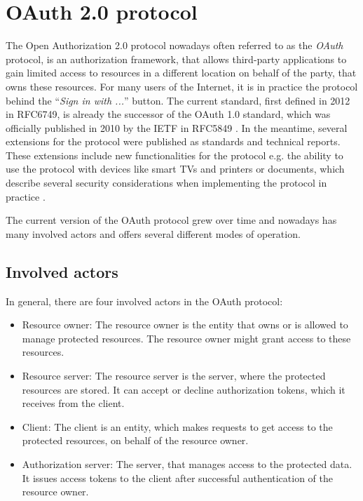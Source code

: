 \documentclass[
    fontsize=12pt,
    headings=small,
    parskip=half,           %
    bibliography=totoc,
    numbers=noenddot,       %
    open=any,               %
    ]{scrreprt}
\begin{document}
\section{OAuth 2.0 protocol}
The Open Authorization 2.0 protocol nowadays often referred to as the \emph{OAuth} protocol, is an authorization framework, that allows third-party applications to gain limited access to resources in a different location on behalf of the party, that owns these resources. For many users of the Internet, it is in practice the protocol behind the ``\emph{Sign in with ...}'' button. The current standard, first defined in 2012 in RFC6749, is already the successor of the OAuth 1.0 standard, which was officially published in 2010 by the IETF in RFC5849 \cite{hammer2010rfc}. In the meantime, several extensions for the protocol were published as standards and technical reports. These extensions include new functionalities for the protocol e.g. the ability to use the protocol with devices like smart TVs and printers \cite{denniss2019oauth} or documents, which describe several security considerations when implementing the protocol in practice \cite{lodderstedt2020oauth}.

The current version of the OAuth protocol grew over time and nowadays has many involved actors and offers several different modes of operation.

\subsection{Involved actors}
In general, there are four involved actors in the OAuth protocol:
\begin{itemize}
	\item Resource owner: 
	The resource owner is the entity that owns or is allowed to manage protected resources. The resource owner might grant access to these resources.
	\item Resource server: The resource server is the server, where the protected resources are stored. It can accept or decline authorization tokens, which it receives from the client.
	\item Client: The client is an entity, which makes requests to get access to the protected resources, on behalf of the resource owner.
	\item Authorization server: The server, that manages access to the protected data. It issues access tokens to the client after successful authentication of the resource owner.
\end{itemize}
\end{document}
